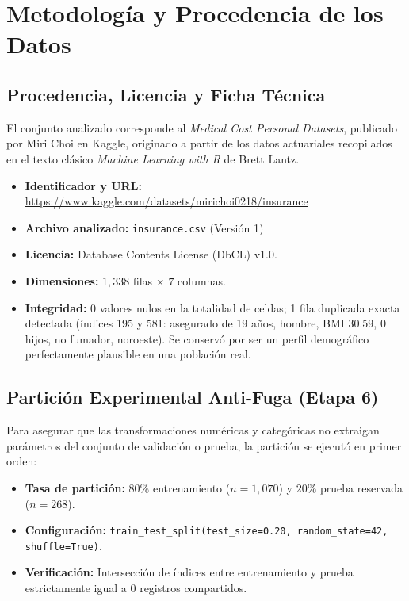 \documentclass[11pt,a4paper]{article}
\begin{document}
\section{Metodología y Procedencia de los Datos}

\subsection{Procedencia, Licencia y Ficha Técnica}
El conjunto analizado corresponde al \textit{Medical Cost Personal Datasets}, publicado por Miri Choi en Kaggle, originado a partir de los datos actuariales recopilados en el texto clásico \textit{Machine Learning with R} de Brett Lantz.
\begin{itemize}[leftmargin=*]
    \item \textbf{Identificador y URL:} \url{https://www.kaggle.com/datasets/mirichoi0218/insurance}
    \item \textbf{Archivo analizado:} \texttt{insurance.csv} (Versión 1)
    \item \textbf{Licencia:} Database Contents License (DbCL) v1.0.
    \item \textbf{Dimensiones:} $1,338$ filas $\times$ $7$ columnas.
    \item \textbf{Integridad:} 0 valores nulos en la totalidad de celdas; 1 fila duplicada exacta detectada (índices 195 y 581: asegurado de 19 años, hombre, BMI 30.59, 0 hijos, no fumador, noroeste). Se conservó por ser un perfil demográfico perfectamente plausible en una población real.
\end{itemize}

\subsection{Partición Experimental Anti-Fuga (Etapa 6)}
Para asegurar que las transformaciones numéricas y categóricas no extraigan parámetros del conjunto de validación o prueba, la partición se ejecutó en primer orden:
\begin{itemize}[leftmargin=*]
    \item \textbf{Tasa de partición:} $80\%$ entrenamiento ($n = 1,070$) y $20\%$ prueba reservada ($n = 268$).
    \item \textbf{Configuración:} \texttt{train\_test\_split(test\_size=0.20, random\_state=42, shuffle=True)}.
    \item \textbf{Verificación:} Intersección de índices entre entrenamiento y prueba estrictamente igual a 0 registros compartidos.
\end{itemize}
\end{document}
